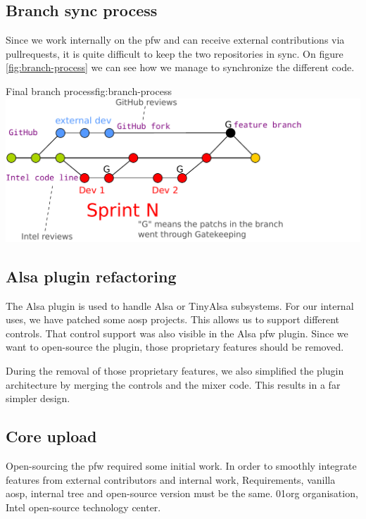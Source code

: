 \subsection{Branch sync process}
Since we work internally on the \gls{pfw} and can receive external contributions via \gls{pullrequests},
it is quite difficult to keep the two repositories in sync.
On figure \ref{fig:branch-process} we can see how we manage to synchronize the different code.

\begin{figureGraphics}{Final branch process}{fig:branch-process}
    \includegraphics[width=\textwidth]{./src/img/branches-process.pdf}
\end{figureGraphics}


\subsection{Alsa plugin refactoring}
The Alsa plugin is used to handle Alsa or TinyAlsa subsystems.
For our internal uses, we have patched some \gls{aosp} projects.
This allows us to support different controls.
That control support was also visible in the Alsa \gls{pfw} plugin. Since
we want to open-source the plugin, those proprietary features should be removed.

During the removal of those proprietary features, we also simplified the plugin
architecture by merging the controls and the mixer code.
This results in a far simpler design.

\subsection{Core upload}
Open-sourcing the \gls{pfw} required some initial work.
In order to smoothly integrate features from external contributors and internal work,
Requirements, vanilla \gls{aosp}, internal tree and open-source version must be the
same.
01org organisation, Intel open-source technology center.

